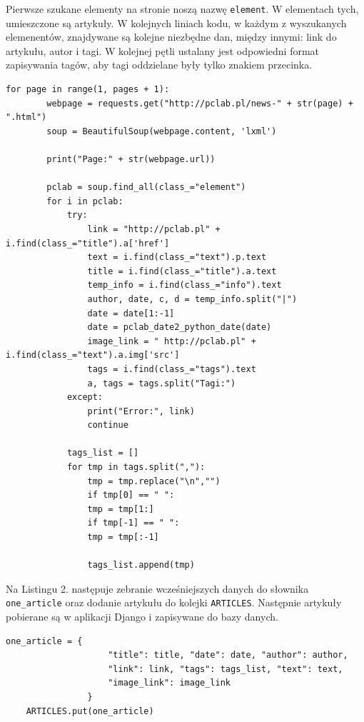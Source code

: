 \documentclass[12pt, titlepage]{article}
\begin{document}
	
	Pierwsze szukane elementy na stronie noszą nazwę  \texttt{element}. W elementach tych, umieszczone są artykuły. W kolejnych liniach kodu, w każdym z wyszukanych elemenentów, znajdywane są kolejne niezbędne dan, między innymi: link do artykułu, autor i tagi. 
	W kolejnej pętli ustalany jest odpowiedni format zapisywania tagów, aby tagi oddzielane były tylko znakiem przecinka.
	\lstset{style=mystyle}
	\begin{lstlisting}[caption={Scraper pclab}]
	for page in range(1, pages + 1):
		webpage = requests.get("http://pclab.pl/news-" + str(page) + ".html")
		soup = BeautifulSoup(webpage.content, 'lxml')
		
		print("Page:" + str(webpage.url))
		
		pclab = soup.find_all(class_="element")
		for i in pclab:
			try:
				link = "http://pclab.pl" + i.find(class_="title").a['href']
				text = i.find(class_="text").p.text
				title = i.find(class_="title").a.text
				temp_info = i.find(class_="info").text
				author, date, c, d = temp_info.split("|")
				date = date[1:-1]
				date = pclab_date2_python_date(date)
				image_link = " http://pclab.pl" + i.find(class_="text").a.img['src']
				tags = i.find(class_="tags").text
				a, tags = tags.split("Tagi:")
			except:
				print("Error:", link)
				continue
			
			tags_list = []
			for tmp in tags.split(","):
				tmp = tmp.replace("\n","")
				if tmp[0] == " ":
				tmp = tmp[1:]
				if tmp[-1] == " ":
				tmp = tmp[:-1]
			
				tags_list.append(tmp)
	\end{lstlisting}
	\newpage
	Na Listingu 2. następuje zebranie wcześniejszych danych do słownika \texttt{one\_article} oraz dodanie artykułu do kolejki \texttt{ARTICLES}. Następnie artykuły pobierane są w aplikacji Django i zapisywane do bazy danych.
	\begin{lstlisting}[caption={Scraper pclab cd.}]
	one_article = {
					"title": title, "date": date, "author": author,
					"link": link, "tags": tags_list, "text": text, 
					"image_link": image_link
				}
	ARTICLES.put(one_article)
	\end{lstlisting}
	
\end{document}
